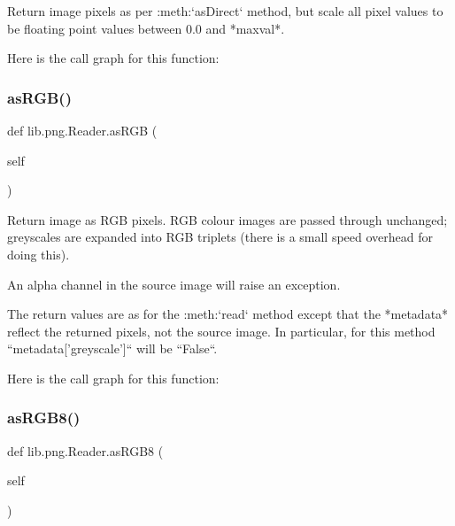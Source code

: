 \begin{DoxyVerb}Return image pixels as per :meth:`asDirect` method, but scale
all pixel values to be floating point values between 0.0 and
*maxval*.
\end{DoxyVerb}
 Here is the call graph for this function\+:
\mbox{\label{classlib_1_1png_1_1_reader_a6ca94eae486ee2820a2487a12c42a2c0}} 
\subsubsection{\texorpdfstring{as\+R\+G\+B()}{asRGB()}}
{\footnotesize\ttfamily def lib.\+png.\+Reader.\+as\+R\+GB (\begin{DoxyParamCaption}\item[{}]{self }\end{DoxyParamCaption})}

\begin{DoxyVerb}Return image as RGB pixels.  RGB colour images are passed
through unchanged; greyscales are expanded into RGB
triplets (there is a small speed overhead for doing this).

An alpha channel in the source image will raise an
exception.

The return values are as for the :meth:`read` method
except that the *metadata* reflect the returned pixels, not the
source image.  In particular, for this method
``metadata['greyscale']`` will be ``False``.
\end{DoxyVerb}
 Here is the call graph for this function\+:
\mbox{\label{classlib_1_1png_1_1_reader_a69f44e7d9394ce45fefe711cd1ac03b5}} 
\subsubsection{\texorpdfstring{as\+R\+G\+B8()}{asRGB8()}}
{\footnotesize\ttfamily def lib.\+png.\+Reader.\+as\+R\+G\+B8 (\begin{DoxyParamCaption}\item[{}]{self }\end{DoxyParamCaption})}

